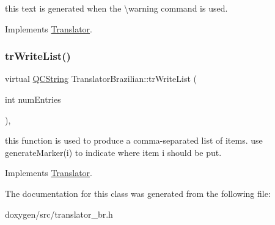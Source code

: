 this text is generated when the \textbackslash{}warning command is used. 

Implements \mbox{\hyperlink{class_translator}{Translator}}.

\mbox{\label{class_translator_brazilian_acaecaff49a31e83740a9924f4daa488b}} 
\subsubsection{\texorpdfstring{trWriteList()}{trWriteList()}}
{\footnotesize\ttfamily virtual \mbox{\hyperlink{class_q_c_string}{Q\+C\+String}} Translator\+Brazilian\+::tr\+Write\+List (\begin{DoxyParamCaption}\item[{int}]{num\+Entries }\end{DoxyParamCaption})\hspace{0.3cm}{\ttfamily [inline]}, {\ttfamily [virtual]}}

this function is used to produce a comma-\/separated list of items. use generate\+Marker(i) to indicate where item i should be put. 

Implements \mbox{\hyperlink{class_translator}{Translator}}.



The documentation for this class was generated from the following file\+:\begin{DoxyCompactItemize}
\item 
doxygen/src/translator\+\_\+br.\+h\end{DoxyCompactItemize}
